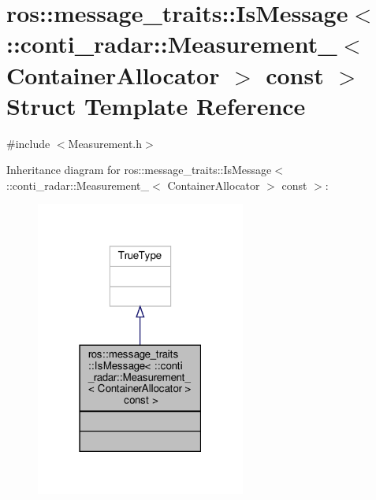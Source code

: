 \hypertarget{structros_1_1message__traits_1_1IsMessage_3_01_1_1conti__radar_1_1Measurement___3_01ContainerAllocator_01_4_01const_01_4}{}\section{ros\+:\+:message\+\_\+traits\+:\+:Is\+Message$<$ \+:\+:conti\+\_\+radar\+:\+:Measurement\+\_\+$<$ Container\+Allocator $>$ const $>$ Struct Template Reference}
\label{structros_1_1message__traits_1_1IsMessage_3_01_1_1conti__radar_1_1Measurement___3_01ContainerAllocator_01_4_01const_01_4}


{\ttfamily \#include $<$Measurement.\+h$>$}



Inheritance diagram for ros\+:\+:message\+\_\+traits\+:\+:Is\+Message$<$ \+:\+:conti\+\_\+radar\+:\+:Measurement\+\_\+$<$ Container\+Allocator $>$ const $>$\+:\nopagebreak
\begin{figure}[H]
\begin{center}
\leavevmode
\includegraphics[width=195pt]{dd/d27/structros_1_1message__traits_1_1IsMessage_3_01_1_1conti__radar_1_1Measurement___3_01ContainerAllc9d2b5d7cf9a9cbc25e6266aadb24b9b}
\end{center}
\end{figure}


